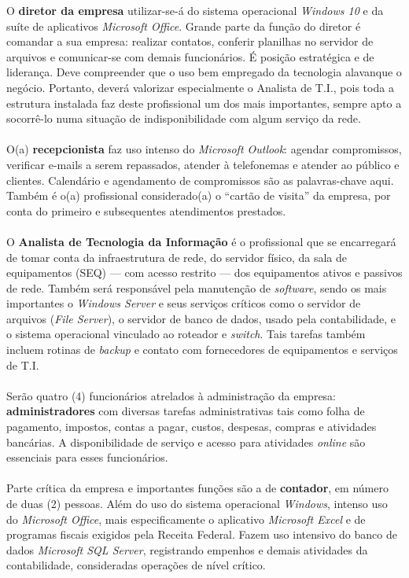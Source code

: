 \documentclass[	DIV=calc,%
							paper=a4,%
							fontsize=12pt,%
							onecolumn]{scrartcl}	 					%
\begin{document}
O \textbf{diretor da empresa} utilizar-se-á do sistema operacional \textit{Windows 10} e da suíte de aplicativos \textit{Microsoft Office}. Grande parte da função do diretor é comandar a sua empresa: realizar contatos, conferir planilhas no servidor de arquivos e comunicar-se com demais funcionários. É posição estratégica e de liderança. Deve compreender que o uso bem empregado da tecnologia alavanque o negócio. Portanto, deverá valorizar especialmente o Analista de T.I., pois toda a estrutura instalada faz deste profissional um dos mais importantes, sempre apto a socorrê-lo numa situação de indisponibilidade com algum serviço da rede.
\\ \\
O(a) \textbf{recepcionista} faz uso intenso do \textit{Microsoft Outlook}: agendar compromissos, verificar e-mails a serem repassados, atender à telefonemas e atender ao público e clientes. Calendário e agendamento de compromissos são as palavras-chave aqui. Também é o(a) profissional considerado(a) o ``cartão de visita'' da empresa, por conta do primeiro e subsequentes atendimentos prestados.
\\ \\
O \textbf{Analista de Tecnologia da Informação} é o profissional que se encarregará de tomar conta da infraestrutura de rede, do servidor físico, da sala de equipamentos (SEQ) --- com acesso restrito --- dos equipamentos ativos e passivos de rede. Também será responsável pela manutenção de \textit{software}, sendo os mais importantes o \textit{Windows Server }e seus serviços críticos como o servidor de arquivos (\textit{File Server}), o servidor de banco de dados, usado pela contabilidade, e o sistema operacional vinculado ao roteador e \textit{switch}. Tais tarefas também incluem rotinas de \textit{backup} e contato com fornecedores de equipamentos e serviços de T.I.
\\ \\
Serão quatro (4) funcionários atrelados à administração da empresa:  \textbf{administradores} com diversas tarefas administrativas tais como folha de pagamento, impostos, contas a pagar, custos, despesas, compras e atividades bancárias. A disponibilidade de serviço e acesso para atividades \textit{online} são essenciais para esses funcionários.
\\ \\
Parte crítica da empresa e importantes funções são a de \textbf{contador}, em número de duas (2) pessoas. Além do uso do sistema operacional \textit{Windows}, intenso uso do \textit{Microsoft Office}, mais especificamente o aplicativo \textit{Microsoft Excel} e de programas fiscais exigidos pela Receita Federal. Fazem uso intensivo do banco de dados \textit{Microsoft SQL Server}, registrando empenhos e demais atividades da contabilidade, consideradas operações de nível crítico.
\end{document}
